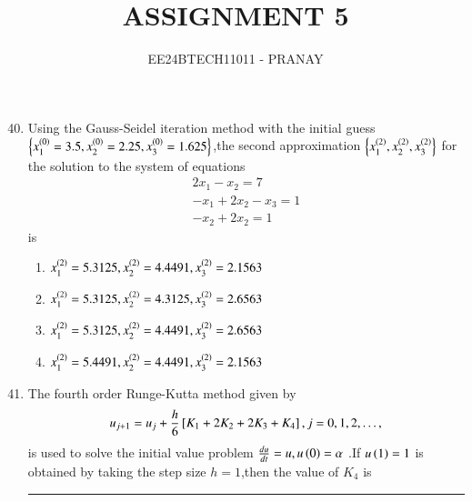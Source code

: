 \documentclass[journal,12pt,onecolumn]{IEEEtran}
\theoremstyle{remark}
\begin{document}

\vspace{3cm}

\title{ASSIGNMENT 5}
\author{EE24BTECH11011 - PRANAY}
\maketitle

\bigskip

\renewcommand{\thefigure}{\theenumi}
\renewcommand{\thetable}{\theenumi}
   \begin{enumerate}\setcounter{enumi}{39}
       \item Using the Gauss-Seidel iteration method with the initial guess $\left\{x_1^{\left(0\right)} = 3.5 , x_2^{\left(0\right)} = 2.25,x_3^{\left(0\right)} = 1.625\right\}$,the second approximation $\left\{x_1^{\left(2\right)},x_2^{\left(2\right)},x_3^{\left(2\right)}\right\}$ for the solution to the system of equations
       \begin{align}
           2x_1 - x_2 = 7\\
           -x_1 +2x_2-x_3 =1\\
           -x_2+2x_2=1
       \end{align}
       is
       \begin{enumerate}
           \item $x_1^{\left(2\right)}=5.3125, x_2^{\left(2\right)}=4.4491, x_3^{\left(2\right)} = 2.1563$\\
            \item $x_1^{\left(2\right)}=5.3125, x_2^{\left(2\right)}=4.3125, x_3^{\left(2\right)} = 2.6563$\\
             \item $x_1^{\left(2\right)}=5.3125, x_2^{\left(2\right)}=4.4491, x_3^{\left(2\right)} = 2.6563$\\
              \item $x_1^{\left(2\right)}=5.4491, x_2^{\left(2\right)}=4.4491, x_3^{\left(2\right)} = 2.1563$\\
       \end{enumerate}
       \item The fourth order Runge-Kutta method given by
       \begin{align}
           u_{j+1} = u_j +\frac{h}{6}{}\left[K_1+2K_2+2K_3+K_4\right], j=0,1,2,\dots,
       \end{align}
       is used to solve the initial value problem $\frac{du}{dt}=u , u\left(0\right)=\alpha$ .If $u\left(1\right)=1$ is obtained by taking the step size  $h=1$,then the value of $K_4$ is \rule{3cm}{0.15mm}\\

\end{enumerate}
\end{document}

